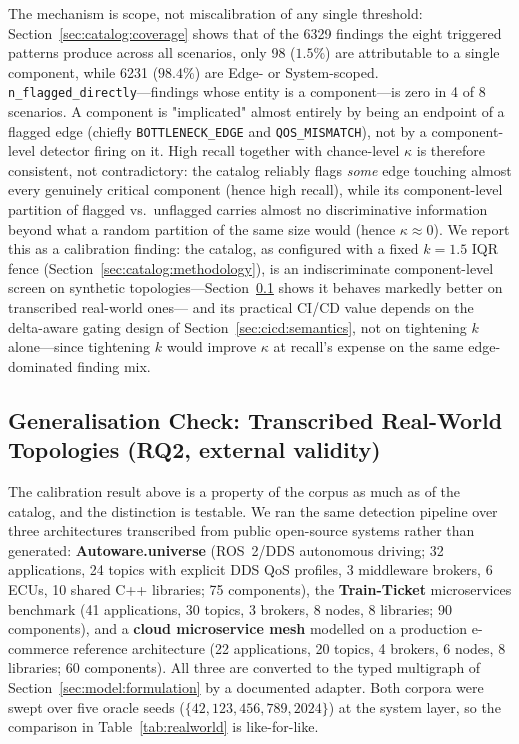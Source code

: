 The mechanism is scope, not miscalibration of any single threshold: Section~\ref{sec:catalog:coverage} shows that of the 6329 findings the eight triggered patterns produce across all scenarios, only 98 ($1.5\%$) are attributable to a single component, while 6231 ($98.4\%$) are Edge- or System-scoped. \texttt{n\_flagged\_directly}---findings whose entity is a component---is zero in 4 of 8 scenarios. A component is "implicated" almost entirely by being an endpoint of a flagged edge (chiefly \texttt{BOTTLENECK\_EDGE} and \texttt{QOS\_MISMATCH}), not by a component-level detector firing on it. High recall together with chance-level $\kappa$ is therefore consistent, not contradictory: the catalog reliably flags \emph{some} edge touching almost every genuinely critical component (hence high recall), while its component-level partition of flagged vs.\ unflagged carries almost no discriminative information beyond what a random partition of the same size would (hence $\kappa \approx 0$). We report this as a calibration finding: the catalog, as configured with a fixed $k=1.5$ IQR fence (Section~\ref{sec:catalog:methodology}), is an indiscriminate component-level screen on synthetic topologies---Section~\ref{sec:results:realworld} shows it behaves markedly better on transcribed real-world ones--- and its practical CI/CD value depends on the delta-aware gating design of Section~\ref{sec:cicd:semantics}, not on tightening $k$ alone---since tightening $k$ would improve $\kappa$ at recall's expense on the same edge-dominated finding mix.

\subsection{Generalisation Check: Transcribed Real-World Topologies (RQ2, external validity)}
\label{sec:results:realworld}

The calibration result above is a property of the corpus as much as of the catalog, and the
distinction is testable. We ran the same detection pipeline over three architectures transcribed
from public open-source systems rather than generated: \textbf{Autoware.universe} (ROS~2/DDS
autonomous driving; 32 applications, 24 topics with explicit DDS QoS profiles, 3 middleware
brokers, 6 ECUs, 10 shared C++ libraries; 75 components), the \textbf{Train-Ticket} microservices
benchmark (41 applications, 30 topics, 3 brokers, 8 nodes, 8 libraries; 90 components), and a
\textbf{cloud microservice mesh} modelled on a production e-commerce reference architecture (22
applications, 20 topics, 4 brokers, 6 nodes, 8 libraries; 60 components). All three are converted
to the typed multigraph of Section~\ref{sec:model:formulation} by a documented adapter. Both
corpora were swept over five oracle seeds ($\{42, 123, 456, 789, 2024\}$) at the system layer, so
the comparison in Table~\ref{tab:realworld} is like-for-like.


